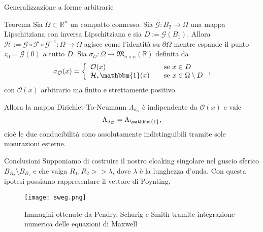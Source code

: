 \documentclass{beamer}
\newcommand{\bbR}{\mathbb{R}}
\newcommand{\de}{\partial}
\newcommand{\OO}{\mathcal{O}}
\newcommand{\F}{\mathcal{F}}
\newcommand{\1}{\mathbbm{1}}
\begin{document}
\begin{frame}{Generalizzazione a forme arbitrarie}
\begin{block}{Teorema}
Sia $\Omega\subset\bbR^n$ un compatto connesso. Sia $\mathcal{G}:B_2\rightarrow\Omega$ una mappa Lipschitziana con inversa Lipschitziana e sia $D:=\mathcal{G}(B_1)$. \pause Allora $\mathcal{H}:=\mathcal{G}\circ\F\circ\mathcal{G}^{-1}: \Omega\rightarrow\Omega$ agisce come l'identità su $\de\Omega$ mentre espande il punto $z_0=\mathcal{G}(0)$ a tutto $D$. Sia $\sigma_\OO:\Omega\rightarrow\mathfrak{M}_{n\times n}(\bbR)$ definita da
\[
\sigma_\OO(x) = 
	\left\{\begin{array}{lll}
         \OO(x) & & \text{se } x\in D \\
         \mathcal{H}_*\1(x) & & \text{se } x\in \Omega\setminus D
    \end{array}\right.,
\]
con $\OO(x)$ arbitrario ma finito e strettamente positivo. \pause

Allora la mappa Dirichlet-To-Neumann $\Lambda_{\sigma_\OO}$ è indipendente da $\OO(x)$ e vale
\[ \Lambda_{\sigma_\OO} = \Lambda_\1 ,\]
cioè le due conducibilità sono assolutamente indistinguibili tramite sole misurazioni esterne.
\end{block}
\end{frame}


\begin{frame}{Conclusioni}
\pause
Supponiamo di costruire il nostro cloaking singolare nel guscio sferico $B_{R_2}\setminus B_{R_1}$ e che valga $R_1,R_2>>\lambda$, dove $\lambda$ è la lunghezza d'onda. Con questa ipotesi possiamo rappresentare il vettore di Poynting.
\pause
\begin{figure}[h] 
\centering 
\texttt{[image: sweg.png]}
\caption{Immagini ottenute da Pendry, Schurig e Smith tramite integrazione numerica delle equazioni di Maxwell}
\end{figure}
\end{frame}
\end{document}
